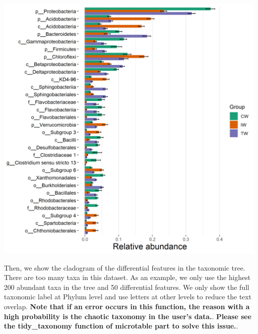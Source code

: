 \documentclass[
]{book}
\newenvironment{Shaded}{\begin{snugshade}}{\end{snugshade}}
\newcommand{\AttributeTok}[1]{\textcolor[rgb]{0.77,0.63,0.00}{#1}}
\newcommand{\CommentTok}[1]{\textcolor[rgb]{0.56,0.35,0.01}{\textit{#1}}}
\newcommand{\DecValTok}[1]{\textcolor[rgb]{0.00,0.00,0.81}{#1}}
\newcommand{\FunctionTok}[1]{\textcolor[rgb]{0.00,0.00,0.00}{#1}}
\newcommand{\NormalTok}[1]{#1}
\newcommand{\SpecialCharTok}[1]{\textcolor[rgb]{0.00,0.00,0.00}{#1}}
\newcommand{\StringTok}[1]{\textcolor[rgb]{0.31,0.60,0.02}{#1}}
\begin{document}
\begin{center}\includegraphics[width=650px]{Images/plot_lefse_diff_abund} \end{center}

Then, we show the cladogram of the differential features in the taxonomic tree.
There are too many taxa in this dataset.
As an example, we only use the highest 200 abundant taxa in the tree and 50 differential features.
We only show the full taxonomic label at Phylum level and use letters at other levels to reduce the text overlap.
\textbf{Note that if an error occurs in this function, the reason with a high probability is the chaotic taxonomy in the user's data.}.
\textbf{Please see the tidy\_taxonomy function of microtable part to solve this issue.}.

\begin{Shaded}
\end{Shaded}
\end{document}
